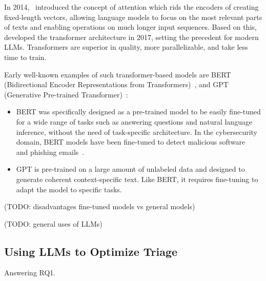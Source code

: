 In 2014,\ \citet{bahdanau2014neural} introduced the concept of attention which rids the encoders of creating
fixed-length vectors, allowing language models to focus on the most relevant parts of texts and enabling operations on
much longer input sequences.
Based on this,\ \citet{vaswani2017attention} developed the transformer architecture in 2017, setting the precedent for
modern LLMs.
Transformers are superior in quality, more parallelizable, and take less time to train.

Early well-known examples of such transformer-based models are BERT
(Bidirectional Encoder Representations from Transformers)\ \citep{devlin2018bert}, and
GPT (Generative Pre-trained Transformer)\ \citep{radford2018improving}:
\begin{itemize}
    \item BERT was specifically designed as a pre-trained model to be easily fine-tuned for a wide range of tasks such
    as answering questions and natural language inference, without the need of task-specific architecture.
    In the cybersecurity domain, BERT models have been fine-tuned to detect malicious
    software\ \citep{rahali2021malbert} and phishing emails\ \citep{lee2020catbert}.
    \item GPT is pre-trained on a large amount of unlabeled data and designed to generate coherent context-specific
    text.
    Like BERT, it requires fine-tuning to adapt the model to specific tasks.
\end{itemize}

(TODO: disadvantages fine-tuned models vs general models) %

(TODO: general uses of LLMs) %

\subsection{Using LLMs to Optimize Triage}
\label{subsec:rq1-llms-in-context}

Answering RQ1.